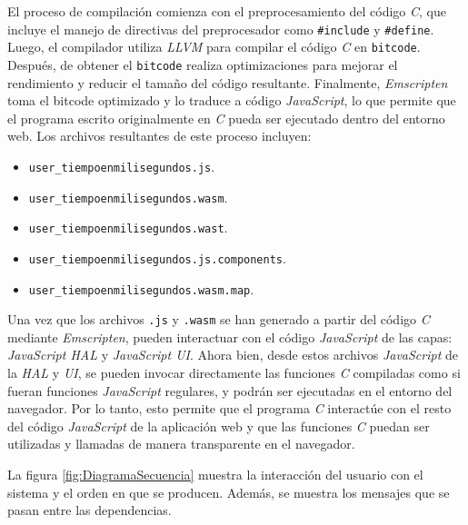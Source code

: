 El proceso de compilación comienza con el preprocesamiento del código \textit{C}, que incluye el manejo de directivas del preprocesador como \texttt{\#include} y \texttt{\#define}. Luego, el compilador utiliza \textit{LLVM} para compilar el código \textit{C} en \texttt{bitcode}. Después, de obtener el \texttt{bitcode} realiza optimizaciones para mejorar el rendimiento y reducir el tamaño del código resultante. Finalmente, \textit{Emscripten} toma el bitcode optimizado y lo traduce a código \textit{JavaScript}, lo que permite que el programa escrito originalmente en \textit{C} pueda ser ejecutado dentro del entorno web. Los archivos resultantes de este proceso incluyen: 


\begin{itemize}
	\item \texttt{user\_tiempoenmilisegundos.js}.
	\item \texttt{user\_tiempoenmilisegundos.wasm}.
	\item \texttt{user\_tiempoenmilisegundos.wast}.
	\item \texttt{user\_tiempoenmilisegundos.js.components}.
	\item \texttt{user\_tiempoenmilisegundos.wasm.map}.
\end{itemize}

Una vez que los archivos \texttt{.js} y \texttt{.wasm} se han generado a partir del código \textit{C}  mediante \textit{Emscripten}, pueden interactuar con el código \textit{JavaScript} de las capas: \textit{JavaScript HAL} y \textit{JavaScript UI}. Ahora bien, desde estos archivos \textit{JavaScript} de la \textit{HAL} y \textit{UI}, se pueden invocar directamente las funciones \textit{C} compiladas como si fueran funciones \textit{JavaScript} regulares, y podrán ser ejecutadas en el entorno del navegador. Por lo tanto, esto permite que el programa \textit{C} interactúe con el resto del código \textit{JavaScript} de la aplicación web y que las funciones \textit{C} puedan ser utilizadas y llamadas de manera transparente en el navegador.


La figura \ref{fig:DiagramaSecuencia} muestra la interacción del usuario con el sistema y el orden en que se producen. Además, se muestra los mensajes que se pasan entre las dependencias.
\hfill \break
\hfill \break
\hfill \break
\hfill \break
\hfill \break
\hfill \break
\hfill \break
\hfill \break
\hfill \break
\hfill \break

